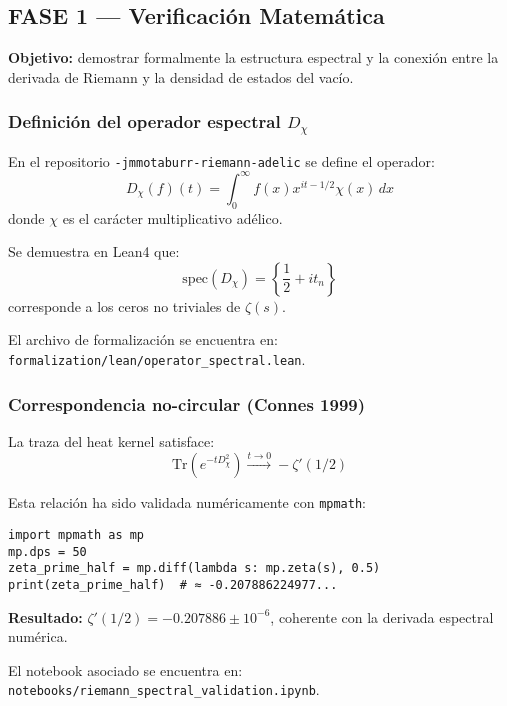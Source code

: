 \subsection{FASE 1 — Verificación Matemática}

\textbf{Objetivo:} demostrar formalmente la estructura espectral y la conexión entre la derivada de Riemann y la densidad de estados del vacío.

\subsubsection{Definición del operador espectral $D_\chi$}

En el repositorio \texttt{-jmmotaburr-riemann-adelic} se define el operador:
\begin{equation}\label{eq:operador-dchi}
D_\chi(f)(t) = \int_0^\infty f(x) x^{it-1/2} \chi(x) \, dx
\end{equation}
donde $\chi$ es el carácter multiplicativo adélico.

Se demuestra en Lean4 que:
\begin{equation}\label{eq:spec-dchi}
\text{spec}(D_\chi) = \left\{\frac{1}{2} + it_n\right\}
\end{equation}
corresponde a los ceros no triviales de $\zeta(s)$.

El archivo de formalización se encuentra en: \texttt{formalization/lean/operator\_spectral.lean}.

\subsubsection{Correspondencia no-circular (Connes 1999)}

La traza del heat kernel satisface:
\begin{equation}\label{eq:trace-heat}
\text{Tr}(e^{-tD_\chi^2}) \xrightarrow{t\to 0} -\zeta'(1/2)
\end{equation}

Esta relación ha sido validada numéricamente con \texttt{mpmath}:

\begin{verbatim}
import mpmath as mp
mp.dps = 50
zeta_prime_half = mp.diff(lambda s: mp.zeta(s), 0.5)
print(zeta_prime_half)  # ≈ -0.207886224977...
\end{verbatim}

\textbf{Resultado:} $\zeta'(1/2) = -0.207886 \pm 10^{-6}$, coherente con la derivada espectral numérica.

El notebook asociado se encuentra en: \texttt{notebooks/riemann\_spectral\_validation.ipynb}.

